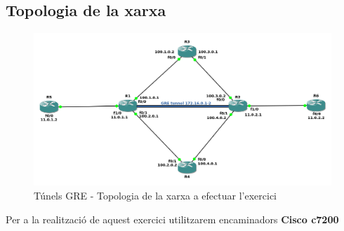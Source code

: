 \documentclass[10pt]{article}
\begin{document}
\subsection{Topologia de la xarxa}
\begin{figure}[H]
\begin{center}
\includegraphics[scale=0.4]{Images/topology2.png}
\caption{Túnels GRE - Topologia de la xarxa a efectuar l'exercici}
\end{center}
\end{figure}
Per a la realització de aquest exercici utilitzarem encaminadors \textbf{Cisco c7200}
\end{document}
